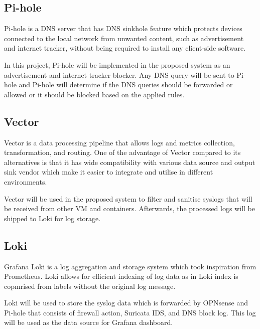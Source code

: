 \documentclass[../index.tex]{subfiles}
\begin{document}
\subsection{Pi-hole}

Pi-hole is a DNS server that has DNS sinkhole feature which protects devices connected to the local
network from unwanted content, such as advertisement and internet tracker, without being required to
install any client-side software.

In this project, Pi-hole will be implemented in the proposed system as an advertisement and internet
tracker blocker. Any DNS query will be sent to Pi-hole and Pi-hole will determine if the DNS queries
should be forwarded or allowed or it should be blocked based on the applied rules.


\subsection{Vector}

Vector is a data processing pipeline that allows logs and metrics collection, transformation, and
routing. One of the advantage of Vector compared to its alternatives is that it has wide
compatibility with various data source and output sink vendor which make it easier to integrate and
utilise in different environments.

Vector will be used in the proposed system to filter and sanitise syslogs that will be received from
other VM and containers. Afterwards, the processed logs will be shipped to Loki for log storage.

\subsection{Loki}

Grafana Loki is a log aggregation and storage system which took inspiration from Prometheus. Loki
allows for efficient indexing of log data as in Loki index is copmrised from labels without the
original log message.

Loki will be used to store the syslog data which is forwarded by OPNsense and Pi-hole that consists
of firewall action, Suricata IDS, and DNS block log. This log will be used as the data source for
Grafana dashboard.
\end{document}
